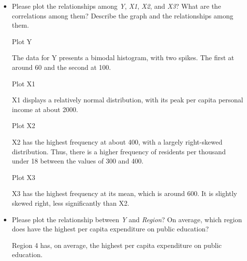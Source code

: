 \documentclass[12pt,letterpaper]{article}
\begin{document}
\vspace{1cm}
\begin{itemize}

\item

Please plot the relationships among \emph{Y}, \emph{X1}, \emph{X2}, and \emph{X3}? What are the correlations among them? Describe the graph and the relationships among them.

\vspace{.5cm}

\noindent Plot Y
  
%
\noindent The data for Y presents a bimodal histogram, with two spikes. The first at around 60 and the second at 100. 

\vspace{.5cm}
\noindent Plot X1

%
\noindent X1 displays a relatively normal distribution, with its peak per capita personal income at about 2000. 

 
\vspace{.5cm}
\noindent Plot X2

%
\noindent X2 has the highest frequency at about 400, with a largely right-skewed distribution. Thus, there is a higher frequency of residents per thousand under 18 between the values of 300 and 400.

\vspace{.5cm}
\noindent Plot X3

%
\noindent X3 has the highest frequency at its mean, which is around 600. It is slightly skewed right, less significantly than X2.
\vspace{1cm}

\item
Please plot the relationship between \emph{Y} and \emph{Region}? On average, which region does have the highest per capita expenditure on public education?
\vspace{.5cm}

%
\noindent Region 4 has, on average, the highest per capita expenditure on public education.
\vspace{1cm}


\end{itemize}
\end{document}
